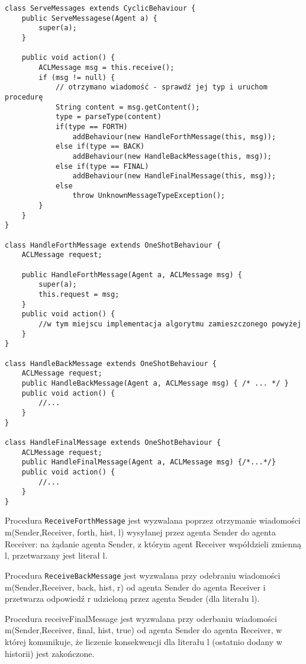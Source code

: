 \documentclass[a4paper,12pt]{mwart}
\begin{document}
\begin{verbatim}
class ServeMessages extends CyclicBehaviour {
    public ServeMessagese(Agent a) {
        super(a);
    }

    public void action() {
        ACLMessage msg = this.receive();
        if (msg != null) {
            // otrzymano wiadomość - sprawdź jej typ i uruchom procedurę
            String content = msg.getContent();
            type = parseType(content)
            if(type == FORTH)
                addBehaviour(new HandleForthMessage(this, msg));
            else if(type == BACK)
                addBehaviour(new HandleBackMessage(this, msg));
            else if(type == FINAL)
                addBehaviour(new HandleFinalMessage(this, msg));
            else
                throw UnknownMessageTypeException();
        }
    }
}

class HandleForthMessage extends OneShotBehaviour {
    ACLMessage request;

    public HandleForthMessage(Agent a, ACLMessage msg) {
        super(a);
        this.request = msg;
    }
    public void action() {
        //w tym miejscu implementacja algorytmu zamieszczonego powyżej
    }
}

class HandleBackMessage extends OneShotBehaviour {
    ACLMessage request;
    public HandleBackMessage(Agent a, ACLMessage msg) { /* ... */ }
    public void action() {
        //...
    }
}

class HandleFinalMessage extends OneShotBehaviour {
    ACLMessage request;
    public HandleFinalMessage(Agent a, ACLMessage msg) {/*...*/}
    public void action() {
        //...
    }
}

\end{verbatim}

Procedura \verb!ReceiveForthMessage! jest wyzwalana poprzez otrzymanie wiadomości m(Sender,Receiver, forth, hist, l) wysyłanej przez agenta Sender do agenta Receiver: na żądanie agenta Sender, z którym agent Receiver współdzieli zmienną l, przetwarzany jest literał l.

Procedura \verb!ReceiveBackMessage! jest wyzwalana przy odebraniu wiadomości m(Sender,Receiver, back, hist, r) od agenta Sender do agenta Receiver i przetwarza odpowiedź r udzieloną przez agenta Sender (dla literału l).

Procedura receiveFinalMessage jest wyzwalana przy oderbaniu wiadomości m(Sender,Receiver, final, hist, true) od agenta Sender do agenta Receiver, w której komunikuje, że liczenie konsekwencji dla literału l (ostatnio dodany w historii) jest zakończone.
\end{document}
